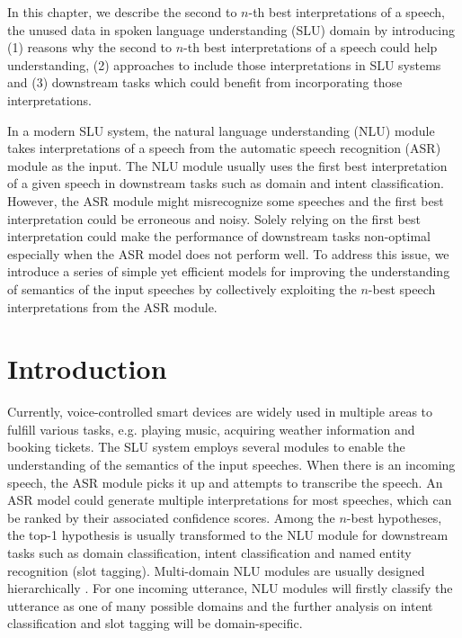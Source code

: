 In this chapter, we describe  the second to $n$-th best interpretations of a speech, the unused data in spoken language understanding (SLU)  domain by introducing (1) reasons why the second to $n$-th best interpretations of a speech could help understanding, (2) approaches to include those interpretations in SLU systems and (3)  downstream tasks which could benefit from incorporating those interpretations. 

In a modern SLU system, the natural language understanding (NLU) module takes interpretations of a speech from the automatic speech recognition (ASR) module as the input. The NLU module usually uses the first best interpretation of a given speech in downstream tasks such as domain and intent classification. However, the ASR module might misrecognize some speeches and the first best interpretation could be erroneous and noisy. Solely relying on the first best interpretation could make the performance of downstream tasks non-optimal especially when the ASR model does not perform well. To address this issue, we introduce a series of simple yet efficient models for improving the understanding of semantics of the input speeches by collectively exploiting the $n$-best speech interpretations from the ASR module. 

\section{Introduction}
\label{alexa:intro}
Currently, voice-controlled smart devices are widely used in multiple areas to fulfill various tasks, e.g. playing music, acquiring weather information and booking tickets. 
The SLU system employs several modules to enable the understanding of the semantics of the input speeches. 
When there is an incoming speech, the ASR module picks it up and attempts to transcribe the speech.
An ASR model could generate multiple interpretations for most speeches, which can be ranked by their associated confidence scores.
Among the $n$-best hypotheses, the top-1 hypothesis is usually transformed to the NLU module for downstream tasks such as domain classification, intent classification and named entity recognition (slot tagging). Multi-domain NLU modules are usually designed hierarchically \citep{tur2011spoken}. For one incoming utterance, NLU modules will firstly classify the utterance as one of many possible domains and the further analysis on intent classification and slot tagging will be domain-specific.


